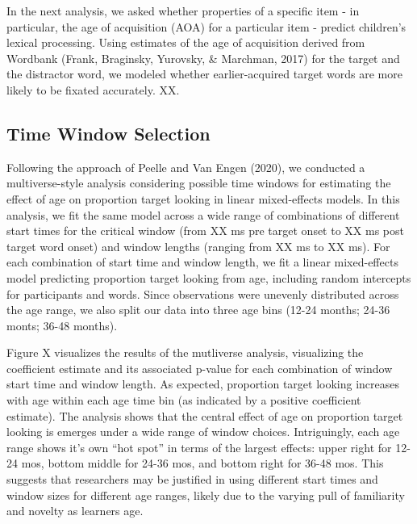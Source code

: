 \documentclass[10pt, letterpaper]{article}
\begin{document}
In the next analysis, we asked whether properties of a specific item -
in particular, the age of acquisition (AOA) for a particular item -
predict children's lexical processing. Using estimates of the age of
acquisition derived from Wordbank (Frank, Braginsky, Yurovsky, \&
Marchman, 2017) for the target and the distractor word, we modeled
whether earlier-acquired target words are more likely to be fixated
accurately. XX.

\hypertarget{time-window-selection}{%
\subsection{Time Window Selection}\label{time-window-selection}}

Following the approach of Peelle and Van Engen (2020), we conducted a
multiverse-style analysis considering possible time windows for
estimating the effect of age on proportion target looking in linear
mixed-effects models. In this analysis, we fit the same model across a
wide range of combinations of different start times for the critical
window (from XX ms pre target onset to XX ms post target word onset) and
window lengths (ranging from XX ms to XX ms). For each combination of
start time and window length, we fit a linear mixed-effects model
predicting proportion target looking from age, including random
intercepts for participants and words. Since observations were unevenly
distributed across the age range, we also split our data into three age
bins (12-24 months; 24-36 monts; 36-48 months).

Figure X visualizes the results of the mutliverse analysis, visualizing
the coefficient estimate and its associated p-value for each combination
of window start time and window length. As expected, proportion target
looking increases with age within each age time bin (as indicated by a
positive coefficient estimate). The analysis shows that the central
effect of age on proportion target looking is emerges under a wide range
of window choices. Intriguingly, each age range shows it's own ``hot
spot'' in terms of the largest effects: upper right for 12-24 mos,
bottom middle for 24-36 mos, and bottom right for 36-48 mos. This
suggests that researchers may be justified in using different start
times and window sizes for different age ranges, likely due to the
varying pull of familiarity and novelty as learners age.
\end{document}
